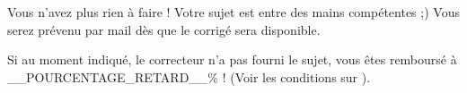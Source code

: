 ﻿Vous n'avez plus rien à faire ! Votre sujet est entre des mains compétentes ;)
Vous serez prévenu par mail dès que le corrigé sera disponible.

Si au moment indiqué, le correcteur n'a pas fourni le sujet, vous êtes remboursé à __POURCENTAGE_RETARD__\% ! (Voir les conditions sur ).